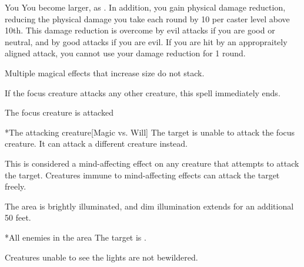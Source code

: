 \spelldur{\durshort \dismissable}
\begin{spelltarget}{You}
    \spellsuccess You become larger, as . In addition, you gain physical damage reduction, reducing the physical damage you take each round by 10  per caster level above 10th. This damage reduction is overcome by evil attacks if you are good or neutral, and by good attacks if you are evil. If you are hit by an appropraitely aligned attack, you cannot use your damage reduction for 1 round.
\end{spelltarget}
\spellnotes Multiple magical effects that increase size do not stack.

\begin{comment}
\subsubsection{S}
\end{comment}

\spellspecial If the focus creature attacks any other creature, this spell immediately ends.
\begin{spelltrigger}{The focus creature is attacked}
    \begin{spelltarget}*{The attacking creature}[Magic vs. Will]
        \spellsuccess The target is unable to attack the focus creature. It can attack a different creature instead.
    \end{spelltarget}
\end{spelltrigger}

\spellnotes This is considered a mind-affecting effect on any creature that attempts to attack the target. Creatures immune to mind-affecting effects can attack the target freely.

\spelldur{\durshort}
\spellline
\spelleffect The area is brightly illuminated, and dim illumination extends for an additional 50 feet.
\begin{spelltarget}*{All enemies in the area}
    \spelleffect The target is \bewildered.
\end{spelltarget}
\spellnotes Creatures unable to see the lights are not bewildered.

